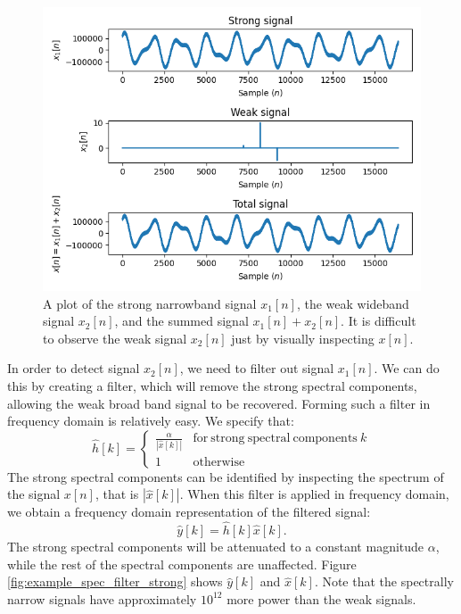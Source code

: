 \begin{figure}
\begin{center}
\includegraphics[width=\textwidth]{code/024_fft_filter/filter_signals.png}
\end{center}
\caption{A plot of the strong narrowband signal $x_1[n]$, the weak wideband signal $x_2[n]$, 
and the summed signal $x_1[n]+x_2[n]$. It is difficult to observe the weak signal $x_2[n]$ just by visually inspecting $x[n]$.}
\label{fig:strong_overpowering_signal}
\end{figure}

In order to detect signal $x_2[n]$, we need to filter out signal
$x_1[n]$. We can do this by creating a filter, which will remove the
strong spectral components, allowing the weak broad band signal to be
recovered. Forming such a filter in frequency domain is relatively
easy. We specify that:
\begin{equation}
\hat{h}[k] = \left\{\begin{array}{cc}
\frac{\alpha}{|\hat{x}[k]|} & \mathrm{for~strong~spectral~components}~k \\
1 & \mathrm{otherwise}
\end{array}
\right. 
\end{equation}
The strong spectral components can be identified by inspecting the
spectrum of the signal $x[n]$, that is $|\hat{x}[k]|$. When this filter is applied
in frequency domain, we obtain a frequency domain representation of the filtered signal:
\begin{equation}
\hat{y}[k] = \hat{h}[k]\hat{x}[k].
\end{equation}
The strong spectral components will be attenuated to a constant
magnitude $\alpha$, while the rest of the spectral components are
unaffected. Figure \ref{fig:example_spec_filter_strong} shows
$\hat{y}[k]$ and $\hat{x}[k]$. Note that the spectrally narrow signals
have approximately $10^{12}$ more power than the weak signals.

